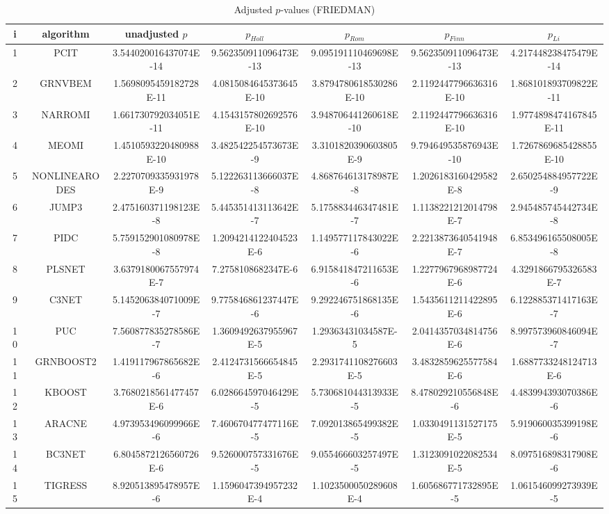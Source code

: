 \documentclass[a4paper,10pt]{article}
\begin{document}
\begin{landscape}
\begin{table}[!htp]
\centering\scriptsize
\caption{Adjusted $p$-values (FRIEDMAN)}
\begin{tabular}{ccccccc}
i&algorithm&unadjusted $p$&$p_{Holl}$&$p_{Rom}$&$p_{Finn}$&$p_{Li}$\\
\hline
1&PCIT&3.544020016437074E-14&9.562350911096473E-13&9.095191110469698E-13&9.562350911096473E-13&4.217448238475479E-14\\
2&GRNVBEM&1.5698095459182728E-11&4.0815084645373645E-10&3.8794780618530286E-10&2.1192447796636316E-10&1.868101893709822E-11\\
3&NARROMI&1.661730792034051E-11&4.1543157802692576E-10&3.948706441260618E-10&2.1192447796636316E-10&1.9774898474167845E-11\\
4&MEOMI&1.4510593220480988E-10&3.482542254573673E-9&3.3101820390603805E-9&9.794649535876943E-10&1.7267869685428855E-10\\
5&NONLINEARODES&2.2270709335931978E-9&5.122263113666037E-8&4.868764613178987E-8&1.2026183160429582E-8&2.650254884957722E-9\\
6&JUMP3&2.475160371198123E-8&5.445351413113642E-7&5.175883446347481E-7&1.1138221212014798E-7&2.945485745442734E-8\\
7&PIDC&5.759152901080978E-8&1.2094214122404523E-6&1.149577117843022E-6&2.2213873640541948E-7&6.853496165508005E-8\\
8&PLSNET&3.6379180067557974E-7&7.2758108682347E-6&6.915841847211653E-6&1.2277967968987724E-6&4.3291866795326583E-7\\
9&C3NET&5.145206384071009E-7&9.775846861237447E-6&9.292246751868135E-6&1.5435611211422895E-6&6.122885371417163E-7\\
10&PUC&7.560877835278586E-7&1.3609492637955967E-5&1.29363431034587E-5&2.0414357034814756E-6&8.997573960846094E-7\\
11&GRNBOOST2&1.419117967865682E-6&2.4124731566654845E-5&2.2931741108276603E-5&3.4832859625577584E-6&1.6887733248124713E-6\\
12&KBOOST&3.7680218561477457E-6&6.028664597046429E-5&5.730681044313933E-5&8.478029210556848E-6&4.483994393070386E-6\\
13&ARACNE&4.973953496099966E-6&7.460670477477116E-5&7.092013865499382E-5&1.0330491131527175E-5&5.919060035399198E-6\\
14&BC3NET&6.8045872126560726E-6&9.526000757331676E-5&9.055466603257497E-5&1.3123091022082534E-5&8.097516898317908E-6\\
15&TIGRESS&8.920513895478957E-6&1.1596047394957232E-4&1.1023500050289608E-4&1.605686771732895E-5&1.061546099273939E-5\\

\end{tabular}
\end{table}
\end{landscape}
\end{document}

